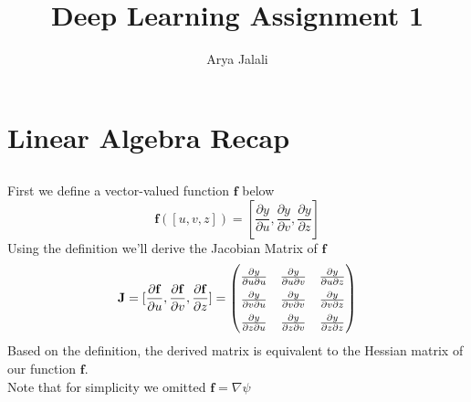 \documentclass{article}
\title{Deep Learning Assignment 1}
\author{Arya Jalali}
\begin{document}
\maketitle

\section{Linear Algebra Recap}
\subsection{}
First we define a vector-valued function $\mathbf{f}$ below
\begin{equation}
    \mathbf{f}([u,v,z]) = [\frac{\partial y}{\partial u},\frac{\partial y}{\partial v},\frac{\partial y}{\partial z}] 
\end{equation}
Using the definition we'll derive the Jacobian Matrix of $\mathbf{f}$
\begin{equation}
    \mathbf{J} = [\frac{\partial \mathbf{f}}{\partial u}, \frac{\partial \mathbf{f}}{\partial v}, \frac{\partial \mathbf{f}}{\partial z}] = 
    \begingroup
    \renewcommand*{\arraystretch}{1.5}
    \begin{pmatrix}
    \frac{\partial y}{\partial u \partial u} & \frac{\partial y}{\partial u \partial v} & \frac{\partial y}{\partial u \partial z} \\
    \frac{\partial y}{\partial v \partial u} & \frac{\partial y}{\partial v \partial v} & \frac{\partial y}{\partial v \partial z} \\
    \frac{\partial y}{\partial z \partial u} & \frac{\partial y}{\partial z \partial v} & \frac{\partial y}{\partial z \partial z}
    \end{pmatrix}
    \endgroup
\end{equation}
Based on the definition, the derived matrix is equivalent to the Hessian matrix of our function $\mathbf{f}$.
\\ 
Note that for simplicity we omitted $\mathbf{f} = \nabla \psi$
\end{document}
